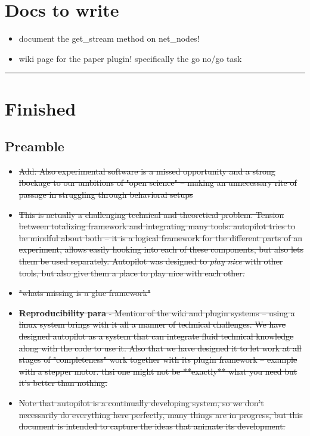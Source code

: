 \section{Docs to write}

\begin{itemize}
\item document the get\_stream method on net\_nodes!
\item wiki page for the paper plugin! specifically the go no/go task
\end{itemize}


\hrule

\section{Finished}


\subsection{Preamble}

\begin{itemize}
\item \sout{Add: Also experimental software is a missed opportunity and a strong lbockage to our ambitions of "open science" -- making an unnecessary rite of passage in struggling through behavioral setups}
\item \sout{This is actually a challenging technical and theoretical problem. Tension between totalizing framework and integrating many tools: autopilot tries to be mindful about both -- it is a logical framework for the different parts of an experiment, allows easily hooking into each of these components, but also lets them be used separately. Autopilot was designed to \textit{play nice} with other tools, but also give them a place to play nice with each other.}
\item \sout{"whats missing is a glue framework"}
\item \sout{\textbf{Reproducibility para} - Mention of the wiki and plugin systems -- using a linux system brings with it all a manner of technical challenges. We have designed autopilot as a system that can integrate fluid technical knowledge along with the code to use it. Also that we have designed it to let work at all stages of "completeness" work together with its plugin framework -- example with a stepper motor. thsi one might not be **exactly** what you need but it's better than nothing.}
\item \sout{Note that autopilot is a continually developing system, so we don't necessarily do everything here perfectly, many things are in progress, but this document is intended to capture the ideas that animate its development.}
\end{itemize}


